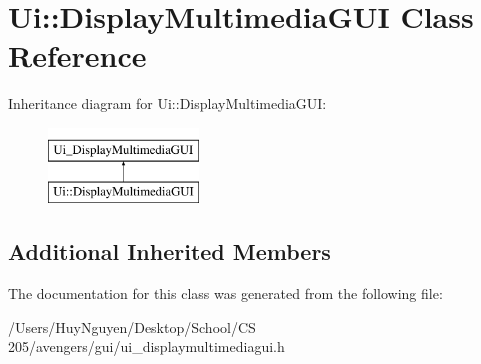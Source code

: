 \hypertarget{classUi_1_1DisplayMultimediaGUI}{}\section{Ui\+:\+:Display\+Multimedia\+G\+UI Class Reference}
\label{classUi_1_1DisplayMultimediaGUI}
Inheritance diagram for Ui\+:\+:Display\+Multimedia\+G\+UI\+:\begin{figure}[H]
\begin{center}
\leavevmode
\includegraphics[height=2.000000cm]{classUi_1_1DisplayMultimediaGUI}
\end{center}
\end{figure}
\subsection*{Additional Inherited Members}


The documentation for this class was generated from the following file\+:\begin{DoxyCompactItemize}
\item 
/\+Users/\+Huy\+Nguyen/\+Desktop/\+School/\+C\+S 205/avengers/gui/ui\+\_\+displaymultimediagui.\+h\end{DoxyCompactItemize}
